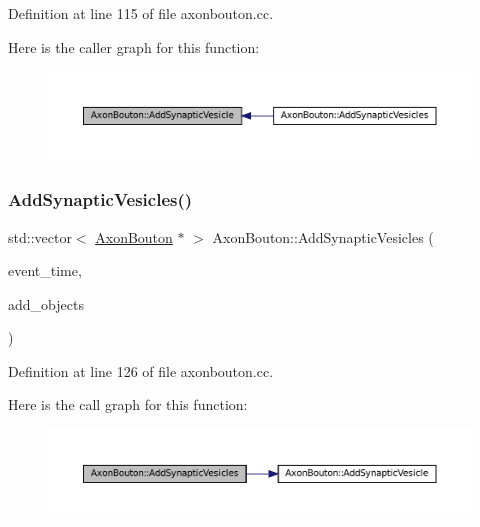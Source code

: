 Definition at line 115 of file axonbouton.\+cc.

Here is the caller graph for this function\+:\nopagebreak
\begin{figure}[H]
\begin{center}
\leavevmode
\includegraphics[width=350pt]{class_axon_bouton_a3009e5d49c699afa7f633b026b37ed77_icgraph}
\end{center}
\end{figure}
\mbox{\label{class_axon_bouton_a0e264da88f6ca5d77aa42f415cb4f3aa}} 
\subsubsection{\texorpdfstring{Add\+Synaptic\+Vesicles()}{AddSynapticVesicles()}}
{\footnotesize\ttfamily std\+::vector$<$ \mbox{\hyperlink{class_axon_bouton}{Axon\+Bouton}} $\ast$ $>$ Axon\+Bouton\+::\+Add\+Synaptic\+Vesicles (\begin{DoxyParamCaption}\item[{std\+::chrono\+::time\+\_\+point$<$ \mbox{\hyperlink{universe_8h_a0ef8d951d1ca5ab3cfaf7ab4c7a6fd80}{Clock}} $>$}]{event\+\_\+time,  }\item[{std\+::vector$<$ \mbox{\hyperlink{class_axon_bouton}{Axon\+Bouton}} $\ast$$>$}]{add\+\_\+objects }\end{DoxyParamCaption})}



Definition at line 126 of file axonbouton.\+cc.

Here is the call graph for this function\+:\nopagebreak
\begin{figure}[H]
\begin{center}
\leavevmode
\includegraphics[width=350pt]{class_axon_bouton_a0e264da88f6ca5d77aa42f415cb4f3aa_cgraph}
\end{center}
\end{figure}
\mbox{\label{class_axon_bouton_a0e739b20447539f8db3655e83575fcf4}} 
